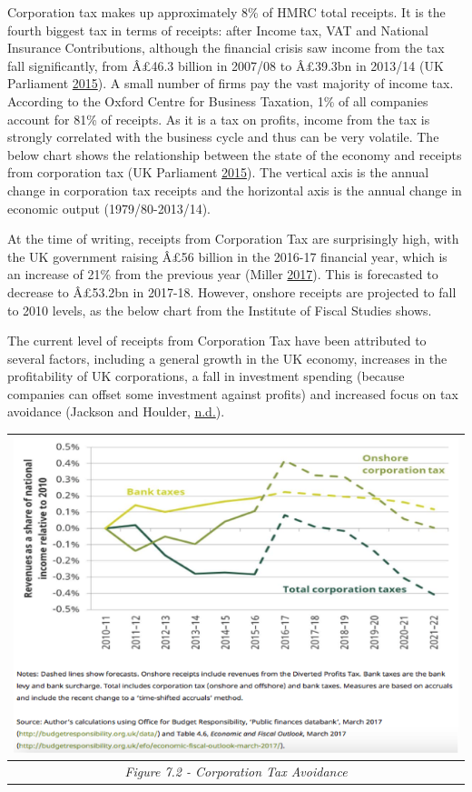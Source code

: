 \documentclass[]{tufte-handout}
\begin{document}
Corporation tax makes up approximately 8\% of HMRC total receipts. It is
the fourth biggest tax in terms of receipts: after Income tax, VAT and
National Insurance Contributions, although the financial crisis saw
income from the tax fall significantly, from Â£46.3 billion in 2007/08
to Â£39.3bn in 2013/14 (UK Parliament
\protect\hyperlink{ref-UKParliament2015}{2015}). A small number of firms
pay the vast majority of income tax. According to the Oxford Centre for
Business Taxation, 1\% of all companies account for 81\% of receipts. As
it is a tax on profits, income from the tax is strongly correlated with
the business cycle and thus can be very volatile. The below chart shows
the relationship between the state of the economy and receipts from
corporation tax (UK Parliament
\protect\hyperlink{ref-UKParliament2015}{2015}). The vertical axis is
the annual change in corporation tax receipts and the horizontal axis is
the annual change in economic output (1979/80-2013/14).

At the time of writing, receipts from Corporation Tax are surprisingly
high, with the UK government raising Â£56 billion in the 2016-17
financial year, which is an increase of 21\% from the previous year
(Miller \protect\hyperlink{ref-Miller2017}{2017}). This is forecasted to
decrease to Â£53.2bn in 2017-18. However, onshore receipts are projected
to fall to 2010 levels, as the below chart from the Institute of Fiscal
Studies shows.

The current level of receipts from Corporation Tax have been attributed
to several factors, including a general growth in the UK economy,
increases in the profitability of UK corporations, a fall in investment
spending (because companies can offset some investment against profits)
and increased focus on tax avoidance (Jackson and Houlder,
\protect\hyperlink{ref-JacksonHoulder}{n.d.}).

\begin{longtable}[]{@{}c@{}}
\toprule
\includegraphics{ChapterPictures/7-2-ReceiptsFromCorpTax.png}\tabularnewline
\midrule
\endhead
\emph{Figure 7.2 - Corporation Tax Avoidance}\tabularnewline
\bottomrule
\end{longtable}
\end{document}
